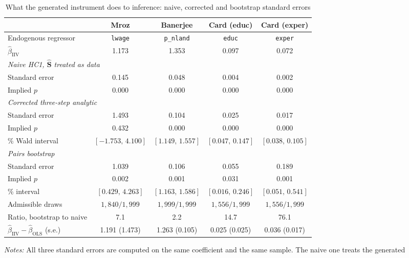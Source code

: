 \begin{table}[htbp]
\centering
\caption{What the generated instrument does to inference: naive, corrected and bootstrap standard errors}
\label{tab:app_inference}
\begin{threeparttable}
\begin{tabular}{lcccc}
\toprule
 & Mroz & Banerjee & Card (educ) & Card (exper) \\
\midrule
Endogenous regressor & \texttt{lwage} & \texttt{p\_nland} & \texttt{educ} & \texttt{exper} \\
$\widehat\beta_{\mathrm{IIV}}$ & 1.173 & 1.353 & 0.097 & 0.072 \\
\midrule
\multicolumn{5}{l}{\emph{Naive HC1, $\widehat{\mathbf S}$ treated as data}} \\
\quad Standard error & 0.145 & 0.048 & 0.004 & 0.002 \\
\quad Implied $p$ & 0.000 & 0.000 & 0.000 & 0.000 \\
\midrule
\multicolumn{5}{l}{\emph{Corrected three-step analytic}} \\
\quad Standard error & 1.493 & 0.104 & 0.025 & 0.017 \\
\quad Implied $p$ & 0.432 & 0.000 & 0.000 & 0.000 \\
\quad 95\% Wald interval & $[-1.753,\,4.100]$ & $[1.149,\,1.557]$ & $[0.047,\,0.147]$ & $[0.038,\,0.105]$ \\
\midrule
\multicolumn{5}{l}{\emph{Pairs bootstrap}} \\
\quad Standard error & 1.039 & 0.106 & 0.055 & 0.189 \\
\quad Implied $p$ & 0.002 & 0.001 & 0.031 & 0.001 \\
\quad 95\% interval & $[0.429,\,4.263]$ & $[1.163,\,1.586]$ & $[0.016,\,0.246]$ & $[0.051,\,0.541]$ \\
\quad Admissible draws & $1{,}840/1{,}999$ & $1{,}999/1{,}999$ & $1{,}556/1{,}999$ & $1{,}556/1{,}999$ \\
\midrule
Ratio, bootstrap to naive & 7.1 & 2.2 & 14.7 & 76.1 \\
$\widehat\beta_{\mathrm{IIV}}-\widehat\beta_{\mathrm{OLS}}$ (s.e.) & 1.191 (1.473) & 1.263 (0.105) & 0.025 (0.025) & 0.036 (0.017) \\
\bottomrule
\end{tabular}
\begin{tablenotes}
\small
\item \textit{Notes:} All three standard errors are computed on the same
coefficient and the same sample. The naive one treats the generated

\end{tablenotes}
\end{threeparttable}
\end{table}
